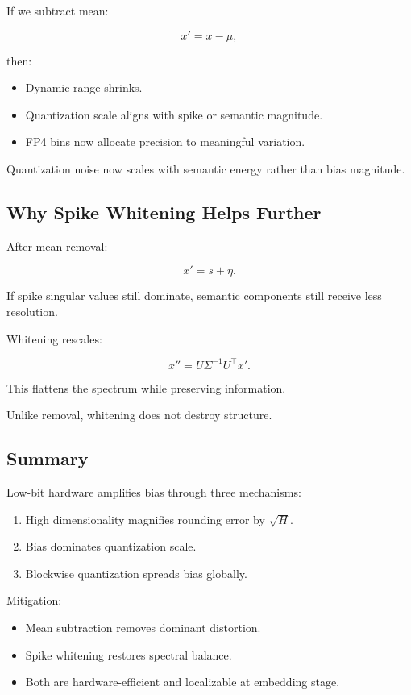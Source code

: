 If we subtract mean:

\[
x' = x - \mu,
\]

then:
\begin{itemize}
\item Dynamic range shrinks.
\item Quantization scale aligns with spike or semantic magnitude.
\item FP4 bins now allocate precision to meaningful variation.
\end{itemize}

Quantization noise now scales with semantic energy rather than bias magnitude.

\subsection{Why Spike Whitening Helps Further}

After mean removal:

\[
x' = s + \eta.
\]

If spike singular values still dominate,
semantic components still receive less resolution.

Whitening rescales:

\[
x'' = U \Sigma^{-1} U^\top x'.
\]

This flattens the spectrum while preserving information.

Unlike removal, whitening does not destroy structure.

\subsection{Summary}

Low-bit hardware amplifies bias through three mechanisms:

\begin{enumerate}
\item High dimensionality magnifies rounding error by $\sqrt{H}$.
\item Bias dominates quantization scale.
\item Blockwise quantization spreads bias globally.
\end{enumerate}

Mitigation:

\begin{itemize}
\item Mean subtraction removes dominant distortion.
\item Spike whitening restores spectral balance.
\item Both are hardware-efficient and localizable at embedding stage.
\end{itemize}

